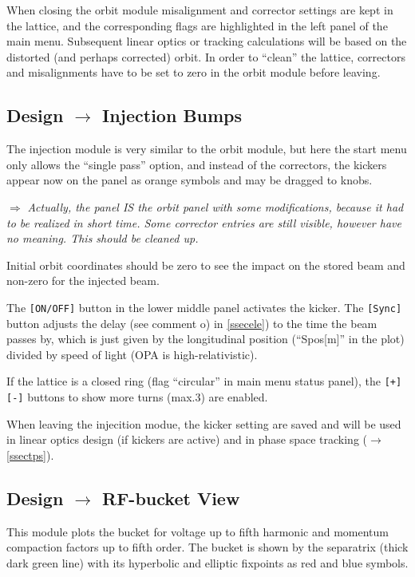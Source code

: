 \documentclass[12pt]{article}
\newcommand{\see}{\mbox{$\rightarrow$}}
\newcommand\todo[1]{$\Longrightarrow$ {\em #1} }
\begin{document}
When closing the orbit module misalignment and corrector settings are kept in the lattice, and the corresponding flags are highlighted in the left panel of the main menu. Subsequent linear optics or tracking calculations will be based on the distorted (and perhaps corrected) orbit. In order to ``clean'' the lattice, correctors and misalignments have to be set to zero in the orbit module before leaving.


\subsection{Design $\longrightarrow$ Injection Bumps}

The injection module is very similar to the orbit module, but here the start menu only allows the ``single pass'' option, and instead of the correctors, the kickers appear now on the panel as orange symbols and may be dragged to knobs.

\todo{Actually, the panel IS the orbit panel with some modifications, because it had to be realized in short time. Some corrector entries are still visible, however have no meaning. This should be cleaned up.}

Initial orbit coordinates should be zero to see the impact on the stored beam and non-zero for the injected beam.

The {\tt [ON/OFF]} button in the lower middle panel activates the kicker. The {\tt [Sync]} button adjusts the delay (see comment o) in \ref{ssecele}) to the time the beam passes by, which is just given by the longitudinal position (``Spos[m]'' in the plot) divided by speed of light (OPA is high-relativistic).

If the lattice is a closed ring (flag ``circular'' in main menu status panel), the {\tt [+] [-]} buttons to show more turns (max.3) are enabled.

When leaving the injecition modue, the kicker setting are saved and will be used in linear optics design (if kickers are active) and in phase space tracking (\see\ref{ssectps}).


\subsection{\label{ssecbuc}Design $\longrightarrow$ RF-bucket View}
This module plots the bucket for voltage up to fifth harmonic and momentum compaction factors up to fifth order. The bucket is shown by the separatrix (thick dark green line) with its hyperbolic and elliptic fixpoints as red and blue symbols.
\end{document}
